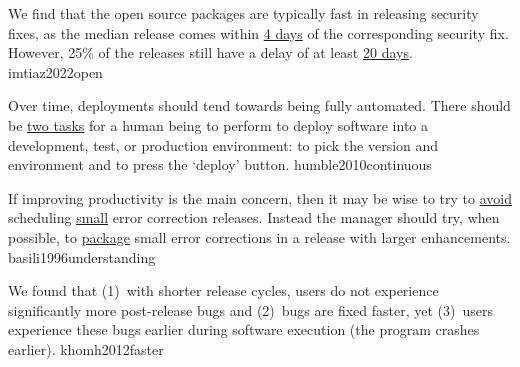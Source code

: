 \documentclass{article}
\begin{document}
  {We find that the open source packages are typically fast in releasing security fixes, as the median release comes within \ul{4 days} of the corresponding security fix. However, 25\% of the releases still have a delay of at least \ul{20 days}.}
  {imtiaz2022open}


  {Over time, deployments should tend towards being fully automated. There should be \ul{two tasks} for a human being to perform to deploy software into a development, test, or production environment: to pick the version and environment and to press the `deploy' button.}
  {humble2010continuous}


  {If improving productivity is the main concern, then it may be wise to try to \ul{avoid} scheduling \ul{small} error correction releases. Instead the manager should try, when possible, to \ul{package} small error corrections in a release with larger enhancements.
  }
  {basili1996understanding}

  {We found that (1)~with shorter release cycles, users do not experience significantly more post-release bugs and (2)~bugs are fixed faster, yet (3)~users experience these bugs earlier during software execution (the program crashes earlier).}
  {khomh2012faster}

\end{document}
